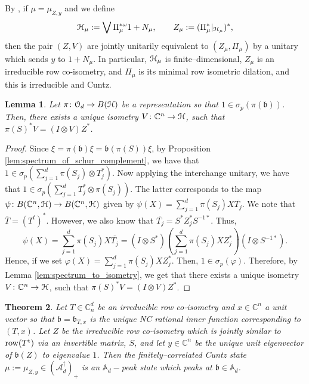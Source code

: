 \documentclass{article}
\newtheorem{thm}{Theorem}[section]
\newtheorem{lem}[thm]{Lemma}
\theoremstyle{definition}
\theoremstyle{remark}
\numberwithin{equation}{section}
\newcommand{\mr}{\ensuremath{\mathrm}}
\newcommand{\om}{\ensuremath{\omega}}
\newcommand{\cuntz}{\ensuremath{\cO_d}}
\def\C{\mathbb{C}}
\def\fb{\mathfrak{b}}
\def\A{\mathbb{A} _d}
\def\mrt{\mathrm{t}}
\def\posncm{(\mathscr{A} _d ^\dagger) _+}
\begin{document}
By \cite[Proposition 3.6]{JMS-ncratClark}, if $\mu = \mu _{Z,y}$ and we define
$$ \cH _\mu := \bigvee \Pi _\mu ^{*\om} 1 + N _\mu, \quad \quad Z_\mu := (\Pi _\mu ^* | _{\cH _\mu } ) ^*, $$ then the pair $(Z, V )$ are jointly unitarily equivalent to $(Z_\mu ,\Pi _\mu )$ by a unitary which sends $y$ to $1 + N_\mu$. In particular, ${\mathcal H} _\mu$ is finite--dimensional, $Z_\mu$ is an irreducible row co-isometry, and $\Pi _\mu$ is its minimal row isometric dilation, and this is irreducible and Cuntz. 

\begin{lem} \label{intertwine2}
Let $\pi \colon \cuntz \to B(\cH)$ be a representation so that $1 \in \sigma _p (\pi (\fb ) )$. Then, there exists a unique isometry $V \colon \C^n \to \cH$, such that $\pi(S)^* V = (I \otimes V) Z^*$.
\end{lem}
\begin{proof}
Since $\xi = \pi(\fb) \xi = \fb(\pi(S)) \xi$, by Proposition \ref{lem:spectrum_of_schur_complement}, we have that $1 \in \sigma_p\left(\sum_{j=1}^d \pi(S_j) \otimes T_j^*\right)$. Now applying the interchange unitary, we have that $1 \in \sigma_p\left(\sum_{j=1}^d T_j^* \otimes \pi(S_j)\right)$. The latter corresponds to the map $\psi \colon B(\C^n, \cH) \to B(\C^n, \cH)$ given by $\psi(X) = \sum_{j=1}^d \pi(S_j) X \overline{T_j}$. We note that $\bar{T} = (T^t)^*$. However, we also know that $\overline{T_j} = S^* Z_j^* S^{-1 *}$. Thus,
\[
\psi(X) = \sum_{j=1}^d \pi(S_j) X \overline{T_j} = (I \otimes S^*) \left(\sum_{j=1}^d \pi(S_j) X Z_j^* \right) (I \otimes S^{-1 *}).
\]
Hence, if we set $\varphi(X) = \sum_{j=1}^d \pi(S_j) X Z_j^*$. Then, $1 \in \sigma_p(\varphi)$. Therefore, by Lemma \ref{lem:spectrum_to_isometry}, we get that there exists a unique isometry $V \colon \C^n \to \cH$, such that $\pi(S)^* V = (I \otimes V) Z^*$.
\end{proof}

\begin{thm} \label{thm:main}
Let $T \in \C ^d _n$ be an irreducible row co-isometry and $x \in \C ^n$ a unit vector so that $\fb = \fb _{T,x}$ is the unique NC rational inner function corresponding to $(T,x)$. Let $Z$ be the irreducible row co-isometry which is jointly similar to $\mr{row} (T ^\mrt )$ via an invertible matrix, $S$, and let $y \in \C ^n$ be the unique unit eigenvector of $\fb (Z)$ to eigenvalue $1$.  Then the finitely--correlated Cuntz state $\mu := \mu _{Z,y} \in \posncm$ is an $\A-$peak state which peaks at $\fb \in \A$.
\end{thm}
\end{document}
